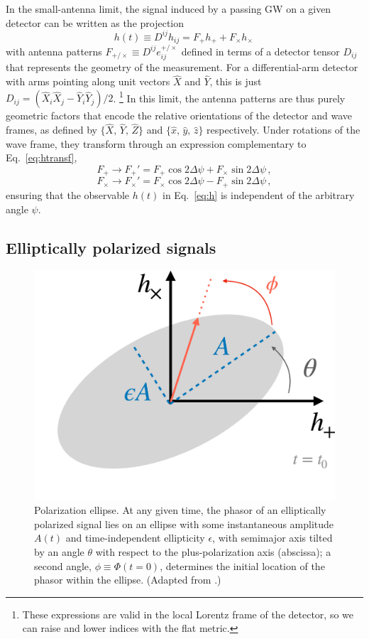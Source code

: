 \documentclass[aps,prd,twocolumn,superscriptaddress,preprintnumbers,floatfix,nofootinbib]{revtex4-2}
\newcommand{\beq}{\begin{equation}}
\newcommand{\eeq}{\end{equation}}
\newcommand*{\eq}[1]{Eq.~\eqref{eq:#1}}
\begin{document}
In the small-antenna limit, the signal induced by a passing GW on a given detector can be written as the projection
\beq \label{eq:h}
h(t) \equiv D^{ij} h_{ij} = F_+ h_+ + F_\times h_\times\, 
\eeq
with antenna patterns $F_{+/\times} \equiv D^{ij} e^{+/\times}_{ij}$ defined in terms of a detector tensor $D_{ij}$ that represents the geometry of the measurement.
For a differential-arm detector with arms pointing along unit vectors $\hat{X}$ and $\hat{Y}$, this is just $D_{ij} = (\hat{X}_i \hat{X}_j - \hat{Y}_i \hat{Y}_j)/2$.%
\footnote{These expressions are valid in the local Lorentz frame of the detector, so we can raise and lower indices with the flat metric.}
In this limit, the antenna patterns are thus purely geometric factors that encode the relative orientations of the detector and wave frames, as defined by $\{\hat{X},\, \hat{Y},\, \hat{Z}\}$ and $\{\hat{x},\, \hat{y},\, \hat{z}\}$ respectively.
Under rotations of the wave frame, they transform through an expression complementary to \eq{htransf},
\beq \label{eq:Ftransf}
F_+ \rightarrow F_+' = F_+ \cos 2\Delta \psi + F_\times \sin 2\Delta\psi \, ,
\eeq
\beq
F_\times \rightarrow F_\times' = F_\times \cos 2\Delta \psi - F_+ \sin 2\Delta\psi \, ,
\eeq
ensuring that the observable $h(t)$ in \eq{h} is independent of the arbitrary angle $\psi$.

\subsection{Elliptically polarized signals}
\label{sec:ellip}

\begin{figure}
\includegraphics[width=0.6\columnwidth]{ellipse}
\caption{Polarization ellipse. At any given time, the phasor of an elliptically polarized signal lies on an ellipse with some instantaneous amplitude $A(t)$ and time-independent ellipticity $\epsilon$, with semimajor axis tilted by an angle $\theta$ with respect to the plus-polarization axis (abscissa); a second angle, $\phi \equiv \Phi(t=0)$, determines the initial location of the phasor within the ellipse. (Adapted from \cite{Isi:2021iql}.)}
\label{fig:ellipse}
\end{figure}
\end{document}

